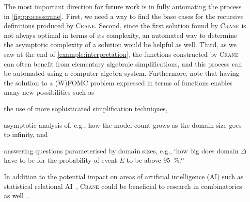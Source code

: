 \documentclass{article}
\theoremstyle{definition}
\theoremstyle{remark}
\begin{document}
The most important direction for future work is in fully automating the process
in \cref{fig:processcrane}. First, we need a way to find the base cases for the
recursive definitions produced by \textsc{Crane}. Second, since the first
solution found by \textsc{Crane} is not always optimal in terms of its
complexity, an automated way to determine the asymptotic complexity of a
solution would be helpful as well. Third, as we saw at the end of
\cref{example:interpretation}, the functions constructed by \textsc{Crane} can
often benefit from elementary algebraic simplifications, and this process can be
automated using a computer algebra system. Furthermore, note that having the
solution to a (W)FOMC problem expressed in terms of functions enables many new
possibilities such as
\begin{enumerate*}[label=(\roman*)]
  \item the use of more sophisticated simplification techniques,
  \item asymptotic analysis of, e.g., how the model count grows as the domain
  size goes to infinity, and
  \item answering questions parameterised by domain sizes, e.g., `how big does
  domain $\Delta$ have to be for the probability of event $E$ to be above
  \SI{95}{\percent}?'
\end{enumerate*}
In addition to the potential impact on areas of artificial intelligence (AI)
such as statistical relational AI~\cite{DBLP:series/synthesis/2016Raedt},
\textsc{Crane} could be beneficial to research in combinatorics as
well~\cite{DBLP:conf/ilp/BarvinekB0ZK21,DBLP:journals/corr/abs-2302-04606}.



\end{document}
